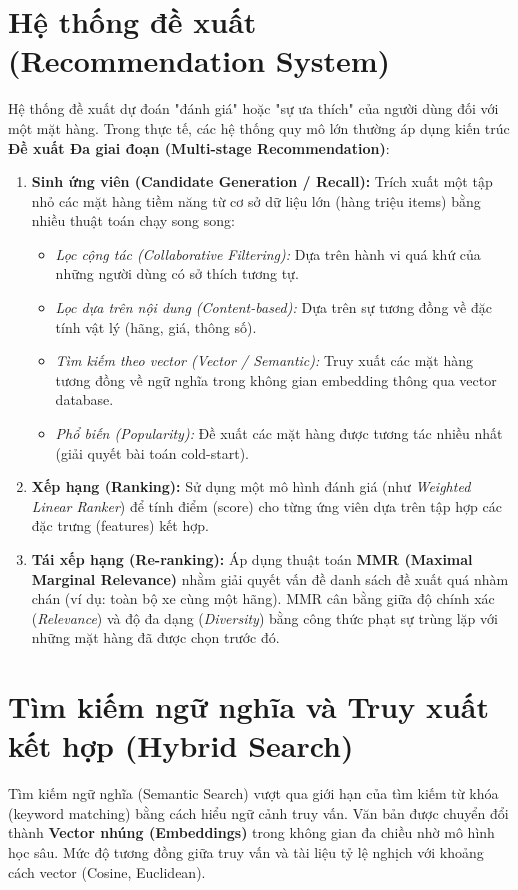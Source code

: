 \section{Hệ thống đề xuất (Recommendation System)}
Hệ thống đề xuất dự đoán "đánh giá" hoặc "sự ưa thích" của người dùng đối với một mặt hàng. Trong thực tế, các hệ thống quy mô lớn thường áp dụng kiến trúc \textbf{Đề xuất Đa giai đoạn (Multi-stage Recommendation)}:
\begin{enumerate}
    \item \textbf{Sinh ứng viên (Candidate Generation / Recall):} Trích xuất một tập nhỏ các mặt hàng tiềm năng từ cơ sở dữ liệu lớn (hàng triệu items) bằng nhiều thuật toán chạy song song:
    \begin{itemize}
        \item \textit{Lọc cộng tác (Collaborative Filtering):} Dựa trên hành vi quá khứ của những người dùng có sở thích tương tự.
        \item \textit{Lọc dựa trên nội dung (Content-based):} Dựa trên sự tương đồng về đặc tính vật lý (hãng, giá, thông số).
        \item \textit{Tìm kiếm theo vector (Vector / Semantic):} Truy xuất các mặt hàng tương đồng về ngữ nghĩa trong không gian embedding thông qua vector database.
        \item \textit{Phổ biến (Popularity):} Đề xuất các mặt hàng được tương tác nhiều nhất (giải quyết bài toán cold-start).
    \end{itemize}
    \item \textbf{Xếp hạng (Ranking):} Sử dụng một mô hình đánh giá (như \textit{Weighted Linear Ranker}) để tính điểm (score) cho từng ứng viên dựa trên tập hợp các đặc trưng (features) kết hợp.
    \item \textbf{Tái xếp hạng (Re-ranking):} Áp dụng thuật toán \textbf{MMR (Maximal Marginal Relevance)} nhằm giải quyết vấn đề danh sách đề xuất quá nhàm chán (ví dụ: toàn bộ xe cùng một hãng). MMR cân bằng giữa độ chính xác (\textit{Relevance}) và độ đa dạng (\textit{Diversity}) bằng công thức phạt sự trùng lặp với những mặt hàng đã được chọn trước đó.
\end{enumerate}

\section{Tìm kiếm ngữ nghĩa và Truy xuất kết hợp (Hybrid Search)}
Tìm kiếm ngữ nghĩa (Semantic Search) vượt qua giới hạn của tìm kiếm từ khóa (keyword matching) bằng cách hiểu ngữ cảnh truy vấn. Văn bản được chuyển đổi thành \textbf{Vector nhúng (Embeddings)} trong không gian đa chiều nhờ mô hình học sâu. Mức độ tương đồng giữa truy vấn và tài liệu tỷ lệ nghịch với khoảng cách vector (Cosine, Euclidean).

